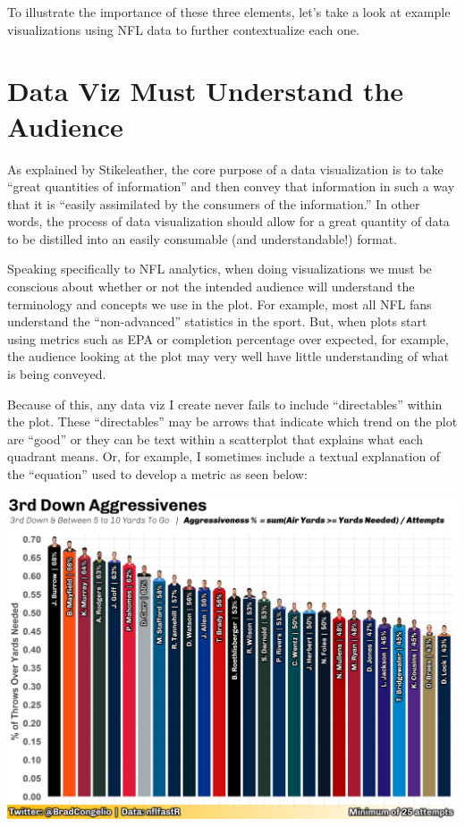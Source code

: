\documentclass[
  letterpaper,
]{krantz}
\begin{document}
To illustrate the importance of these three elements, let's take a look
at example visualizations using NFL data to further contextualize each
one.

\hypertarget{data-viz-must-understand-the-audience}{%
\section{Data Viz Must Understand the
Audience}\label{data-viz-must-understand-the-audience}}

As explained by Stikeleather, the core purpose of a data visualization
is to take ``great quantities of information'' and then convey that
information in such a way that it is ``easily assimilated by the
consumers of the information.'' In other words, the process of data
visualization should allow for a great quantity of data to be distilled
into an easily consumable (and understandable!) format.

Speaking specifically to NFL analytics, when doing visualizations we
must be conscious about whether or not the intended audience will
understand the terminology and concepts we use in the plot. For example,
most all NFL fans understand the ``non-advanced'' statistics in the
sport. But, when plots start using metrics such as EPA or completion
percentage over expected, for example, the audience looking at the plot
may very well have little understanding of what is being conveyed.

Because of this, any data viz I create never fails to include
``directables'' within the plot. These ``directables'' may be arrows
that indicate which trend on the plot are ``good'' or they can be text
within a scatterplot that explains what each quadrant means. Or, for
example, I sometimes include a textual explanation of the ``equation''
used to develop a metric as seen below:

\includegraphics[width=1\textwidth,height=\textheight]{./images/finished-aggressiveness.png}
\end{document}
